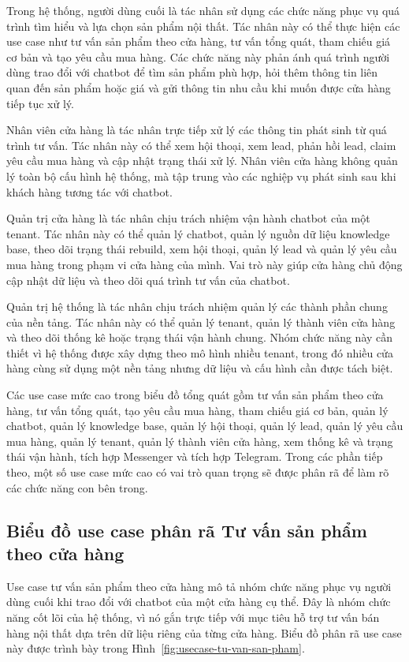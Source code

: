 \documentclass[../DoAn.tex]{subfiles}
\begin{document}
Trong hệ thống, người dùng cuối là tác nhân sử dụng các chức năng phục vụ quá trình tìm hiểu và lựa chọn sản phẩm nội thất. Tác nhân này có thể thực hiện các use case như tư vấn sản phẩm theo cửa hàng, tư vấn tổng quát, tham chiếu giá cơ bản và tạo yêu cầu mua hàng. Các chức năng này phản ánh quá trình người dùng trao đổi với chatbot để tìm sản phẩm phù hợp, hỏi thêm thông tin liên quan đến sản phẩm hoặc giá và gửi thông tin nhu cầu khi muốn được cửa hàng tiếp tục xử lý.

Nhân viên cửa hàng là tác nhân trực tiếp xử lý các thông tin phát sinh từ quá trình tư vấn. Tác nhân này có thể xem hội thoại, xem lead, phản hồi lead, claim yêu cầu mua hàng và cập nhật trạng thái xử lý. Nhân viên cửa hàng không quản lý toàn bộ cấu hình hệ thống, mà tập trung vào các nghiệp vụ phát sinh sau khi khách hàng tương tác với chatbot.

Quản trị cửa hàng là tác nhân chịu trách nhiệm vận hành chatbot của một tenant. Tác nhân này có thể quản lý chatbot, quản lý nguồn dữ liệu knowledge base, theo dõi trạng thái rebuild, xem hội thoại, quản lý lead và quản lý yêu cầu mua hàng trong phạm vi cửa hàng của mình. Vai trò này giúp cửa hàng chủ động cập nhật dữ liệu và theo dõi quá trình tư vấn của chatbot.

Quản trị hệ thống là tác nhân chịu trách nhiệm quản lý các thành phần chung của nền tảng. Tác nhân này có thể quản lý tenant, quản lý thành viên cửa hàng và theo dõi thống kê hoặc trạng thái vận hành chung. Nhóm chức năng này cần thiết vì hệ thống được xây dựng theo mô hình nhiều tenant, trong đó nhiều cửa hàng cùng sử dụng một nền tảng nhưng dữ liệu và cấu hình cần được tách biệt.

Các use case mức cao trong biểu đồ tổng quát gồm tư vấn sản phẩm theo cửa hàng, tư vấn tổng quát, tạo yêu cầu mua hàng, tham chiếu giá cơ bản, quản lý chatbot, quản lý knowledge base, quản lý hội thoại, quản lý lead, quản lý yêu cầu mua hàng, quản lý tenant, quản lý thành viên cửa hàng, xem thống kê và trạng thái vận hành, tích hợp Messenger và tích hợp Telegram. Trong các phần tiếp theo, một số use case mức cao có vai trò quan trọng sẽ được phân rã để làm rõ các chức năng con bên trong.

\subsection{Biểu đồ use case phân rã Tư vấn sản phẩm theo cửa hàng}
\label{subsection:2.2.2}

Use case tư vấn sản phẩm theo cửa hàng mô tả nhóm chức năng phục vụ người dùng cuối khi trao đổi với chatbot của một cửa hàng cụ thể. Đây là nhóm chức năng cốt lõi của hệ thống, vì nó gắn trực tiếp với mục tiêu hỗ trợ tư vấn bán hàng nội thất dựa trên dữ liệu riêng của từng cửa hàng. Biểu đồ phân rã use case này được trình bày trong Hình~\ref{fig:usecase-tu-van-san-pham}.
\end{document}
